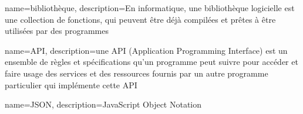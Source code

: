 {
    name=bibliothèque,
    description={En informatique, une bibliothèque logicielle est une collection de fonctions, qui peuvent être déjà compilées et prêtes à être utilisées par des programmes}
}

{
    name=API,
    description={une API (Application Programming Interface) est un ensemble de règles et spécifications qu'un programme peut suivre pour accéder et faire usage des services et des ressources fournis par un autre programme particulier qui implémente cette API}
}

{
    name=JSON,
    description={JavaScript Object Notation}
}